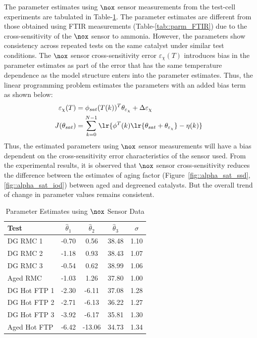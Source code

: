 \par The parameter estimates using $\nox$ sensor measurements from the test-cell experiments are tabulated in
Table-\ref{tab::parm_nox}. The parameter estimates are different from those obtained using FTIR measurements
(Table-\ref{tab::parm_FTIR}) due to the cross-sensitivity of the $\nox$ sensor to ammonia. However, the parameters show
consistency across repeated tests on the same catalyst under similar test conditions. The $\nox$ sensor cross-sensitivity
error $\varepsilon_{\chi}(T)$ introduces bias in the parameter estimates as part of the error that has the
same temperature dependence as the model structure enters into the parameter estimates. Thus, the linear programming problem estimates the parameters with an added bias term as shown below:
\begin{align}
    \varepsilon_{\chi}(T) &= \phi_{sat}(T(k))^T \theta_{\varepsilon_{\chi}} + \Delta\varepsilon_{\chi}\\
    J(\theta_{sat})
                    &= \sum_{k=0}^{N-1} \lr{ \phi^T(k) \lr{\theta_{sat} + \theta_{\varepsilon_{\chi}}} - \eta (k) }
        \label{eqn::nox_cost}
\end{align}
Thus, the estimated parameters using $\nox$ sensor measurements will have a bias dependent on the cross-sensitivity
error characteristics of the sensor used. From the experimental results, it is observed that $\nox$ sensor
cross-sensitivity reduces the difference between the estimates of aging factor
(Figure~\ref{fig::alpha_sat_ssd}, \ref{fig::alpha_sat_iod}) between aged and degreened catalysts. But the overall trend
of change in parameter values remains consistent.
\begin{table}[ht]
        \centering
        \caption{Parameter Estimates using $\nox$ Sensor Data}
        \label{tab::parm_nox}
        \begin{tabular}{l c c c c}
                \hline \hline
                Test & $\hat \theta_1 $ & $\hat \theta_2 $ & $\hat \theta_3 $ & $\sigma$ \\ \hline \hline
                        DG RMC 1 & -0.70 & 0.56 & 38.48 & 1.10\\
                        DG RMC 2 & -1.18 & 0.93 & 38.43 & 1.07\\
                        DG RMC 3 & -0.54 & 0.62 & 38.99 & 1.06\\
                        Aged RMC & -1.03 & 1.26 & 37.80 & 1.00\\ \hline
                        DG Hot FTP 1 & -2.30 & -6.11 & 37.08 & 1.28\\
                        DG Hot FTP 2 & -2.71 & -6.13 & 36.22 & 1.27\\
                        DG Hot FTP 3 & -3.92 & -6.17 & 35.81 & 1.30\\
                        Aged Hot FTP & -6.42 & -13.06 & 34.73 & 1.34\\
                \hline\hline
        \end{tabular}
\end{table}
